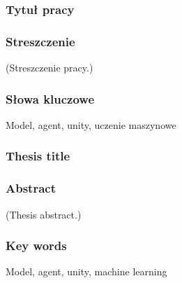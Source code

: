 \documentclass[a4paper,twoside,12pt]{book}
\begin{document}


\cleardoublepage

\rmfamily\normalfont
\pagestyle{empty}



\subsubsection*{Tytuł pracy} 
\Title

\subsubsection*{Streszczenie}  
(Streszczenie pracy.)%

\subsubsection*{Słowa kluczowe} 
Model, agent, unity, uczenie maszynowe

\subsubsection*{Thesis title} 
\begin{otherlanguage}{british}
\TitleAlt
\end{otherlanguage}

\subsubsection*{Abstract} 
\begin{otherlanguage}{british}
(Thesis abstract.)%
\end{otherlanguage}
\subsubsection*{Key words} 
\begin{otherlanguage}{british}
Model, agent, unity, machine learning 
\end{otherlanguage}




\tableofcontents
\end{document}
